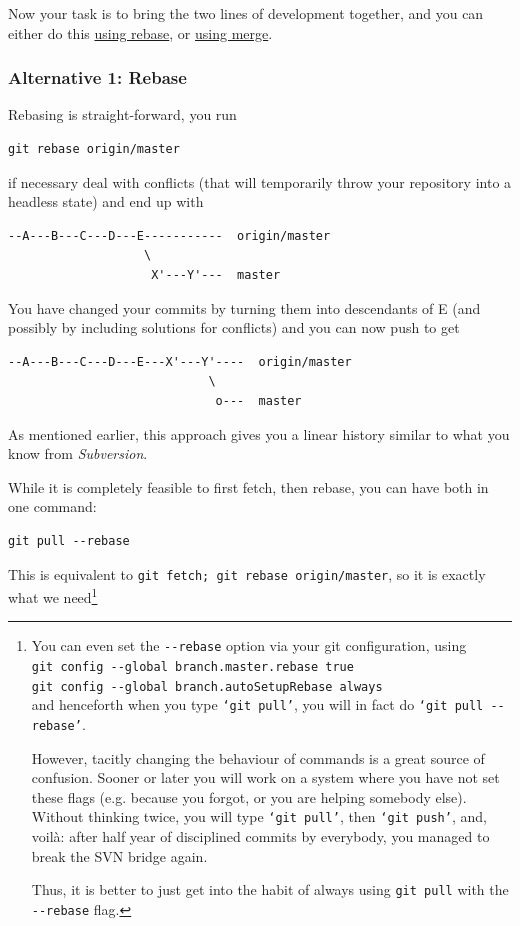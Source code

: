 \documentclass[12pt,pdftex]{article}
\begin{document}
Now your task is to bring the two lines of development together, and
you can either do this \hyperref[Rebase]{using rebase}, or \hyperref[Merge]{using merge}.


\subsubsection{Alternative 1: Rebase}
\label{sec-5-1-1}

Rebasing is straight-forward, you run
\lstset{frame=single,basicstyle=\ttfamily\footnotesize,language=sh,label= ,caption= ,captionpos=b,numbers=none}
\begin{lstlisting}
git rebase origin/master
\end{lstlisting}
if necessary deal with conflicts (that will temporarily throw your
repository into a headless state) and end up with
\begin{verbatim}
--A---B---C---D---E-----------  origin/master
                   \
                    X'---Y'---  master
\end{verbatim}
You have changed your commits by turning them into descendants of E (and
possibly by including solutions for conflicts) and you can now push to
get
\begin{verbatim}
--A---B---C---D---E---X'---Y'----  origin/master
                            \
                             o---  master
\end{verbatim}
As mentioned earlier, this approach gives you a linear history similar
to what you know from \emph{Subversion}.

\bigskip

While it is completely feasible to first fetch, then rebase, you can
have both in one command:
\lstset{frame=single,basicstyle=\ttfamily\footnotesize,language=sh,label= ,caption= ,captionpos=b,numbers=none}
\begin{lstlisting}
git pull --rebase
\end{lstlisting}
This is equivalent to \verb~git fetch; git rebase origin/master~, so it is
exactly what we need\footnote{You can even set the \texttt{-{}-rebase} option via your git configuration,
using\\
\noindent\qquad\qquad  \texttt{git config -{}-global branch.master.rebase true}\\
\noindent\qquad\qquad  \texttt{git config -{}-global branch.autoSetupRebase always}\\
and henceforth when you type \texttt{‘git pull’}, you will in fact do
\texttt{‘git pull -{}-rebase’}.

However, tacitly changing the behaviour of commands is a great source of
confusion.
Sooner or later you will work on a system where you have not set these
flags (e.g. because you forgot, or you are helping somebody else).
Without thinking twice, you will type \texttt{‘git pull’}, then \texttt{‘git push’},
and, voilà: after half year of disciplined commits by everybody, you
managed to break the SVN bridge again.

Thus, it is better to just get into the habit of always using \texttt{git pull}
with the \texttt{-{}-rebase} flag.}
\end{document}
